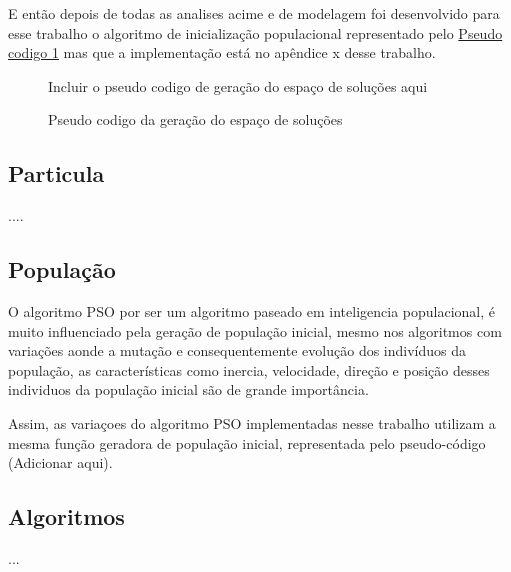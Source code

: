         



        E então depois de todas as analises acime e de modelagem foi desenvolvido para esse trabalho o algoritmo de inicialização populacional representado pelo 
        \hyperref[fig:pseudocodigo-solutionspace]{Pseudo codigo \ref{fig:pseudocodigo-solutionspace}} 
        mas que a implementação está no apêndice x desse trabalho.\hfill

        \begin{figure}[h]
            \centering
            \small{Incluir o pseudo codigo de geração do espaço de soluções aqui}
            \caption{Pseudo codigo da geração do espaço de soluções}
            \label{fig:pseudocodigo-solutionspace}
        \end{figure}


    \subsection{Particula}
        ....


    \subsection{População}
        O algoritmo PSO por ser um algoritmo paseado em inteligencia populacional, é muito influenciado pela geração de população inicial, mesmo nos algoritmos com variações aonde a mutação e consequentemente evolução dos indivíduos da população, as características como inercia, velocidade, direção e posição desses individuos da população inicial são de grande importância.\newline


        


        Assim, as variaçoes do algoritmo PSO implementadas nesse trabalho utilizam a mesma função geradora de população inicial, representada pelo pseudo-código   (Adicionar aqui).


    \subsection{Algoritmos}
        ...
    
